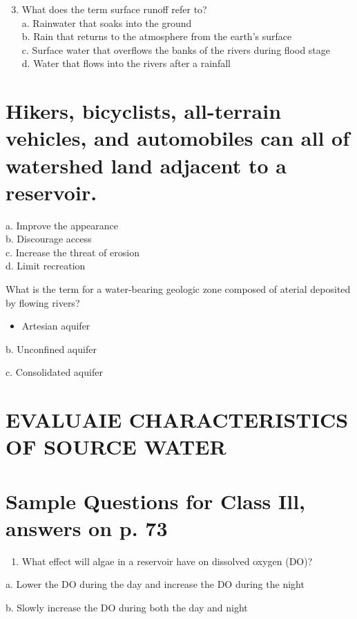 \documentclass[10pt]{article}
\begin{document}
\begin{enumerate}
  \setcounter{enumi}{2}
  \item What does the term surface runoff refer to?\\
a. Rainwater that soaks into the ground\\
b. Rain that returns to the atmosphere from the earth's surface\\
c. Surface water that overflows the banks of the rivers during flood stage\\
d. Water that flows into the rivers after a rainfall
\end{enumerate}

\section{Hikers, bicyclists, all-terrain vehicles, and automobiles can all of watershed land adjacent to a reservoir.}
a. Improve the appearance\\
b. Discourage access\\
c. Increase the threat of erosion\\
d. Limit recreation

What is the term for a water-bearing geologic zone composed of aterial deposited by flowing rivers?

\begin{itemize}
  \item Artesian aquifer
\end{itemize}

b. Unconfined aquifer

c. Consolidated aquifer

\section{EVALUAIE CHARACTERISTICS OF SOURCE WATER}
\section{Sample Questions for Class Ill, answers on p. 73}
\begin{enumerate}
  \item What effect will algae in a reservoir have on dissolved oxygen (DO)?
\end{enumerate}

a. Lower the DO during the day and increase the DO during the night

b. Slowly increase the DO during both the day and night
\end{document}
